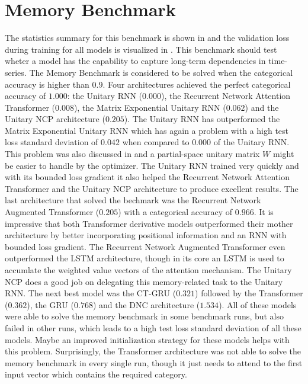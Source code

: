 \documentclass[draft,final]{vutinfth} %
\begin{document}
    \section{Memory Benchmark} \label{memory_results}
    The statistics summary for this benchmark is shown in  and the validation loss during training for all models is visualized in .
    This benchmark should test wheter a model has the capability to capture long-term dependencies in time-series.
    The Memory Benchmark is considered to be solved when the categorical accuracy is higher than $0.9$.
    Four architectures achieved the perfect categorical accuracy of $1.000$: the Unitary RNN ($0.000$), the Recurrent Network Attention Transformer ($0.008$), the Matrix Exponential Unitary RNN ($0.062$) and the Unitary NCP architecture ($0.205$).
    The Unitary RNN has outperformed the Matrix Exponential Unitary RNN which has again a problem with a high test loss standard deviation of $0.042$ when compared to $0.000$ of the Unitary RNN.
    This problem was also discussed in  and a partial-space unitary matrix $W$ might be easier to handle by the optimizer.
    The Unitary RNN trained very quickly and with its bounded loss gradient it also helped the Recurrent Network Attention Transformer and the Unitary NCP architecture to produce excellent results.
    The last architecture that solved the bechmark was the Recurrent Network Augmented Transformer ($0.205$) with a categorical accuracy of $0.966$. 
    It is impressive that both Transformer derivative models outperformed their mother architecture by better incorporating positional information and an RNN with bounded loss gradient.
    The Recurrent Network Augmented Transformer even outperformed the LSTM architecture, though in its core an LSTM is used to accumlate the weighted value vectors of the attention mechanism.
    The Unitary NCP does a good job on delegating this memory-related task to the Unitary RNN.
    The next best model was the CT-GRU ($0.321$) followed by the Transformer ($0.362$), the GRU ($0.768$) and the DNC architecture ($1.534$).
    All of these models were able to solve the memory benchmark in some benchmark runs, but also failed in other runs, which leads to a high test loss standard deviation of all these models.
    Maybe an improved initialization strategy for these models helps with this problem. 
    Surprisingly, the Transformer architecture was not able to solve the memory benchmark in every single run, though it just needs to attend to the first input vector which contains the required category.
\end{document}
